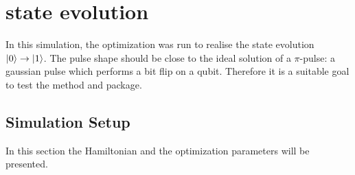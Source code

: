 \documentclass[main.tex]{subfiles}
\begin{document}
\chapter{%
\texorpdfstring{}{0 -> 1} state evolution
}
In this simulation, the optimization was run to realise the state evolution \(\ket{0}\rightarrow\ket{1}\).
The pulse shape should be close to the ideal solution of a \(\pi\)-pulse: a gaussian pulse which performs a bit flip on a qubit.
Therefore it is a suitable goal to test the method and package.


\section{Simulation Setup}
In this section the Hamiltonian and the optimization parameters will be presented.
\end{document}
